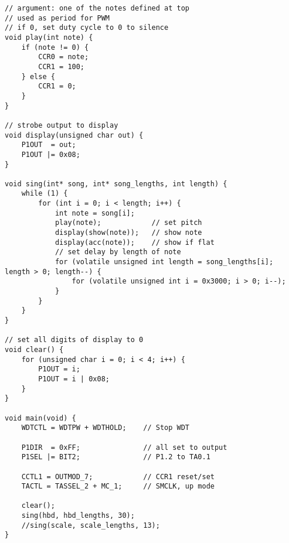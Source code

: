 \documentclass[letterpaper]{article}
\begin{document}
\begin{verbatim}
// argument: one of the notes defined at top
// used as period for PWM
// if 0, set duty cycle to 0 to silence
void play(int note) {
    if (note != 0) {
        CCR0 = note;
        CCR1 = 100;
    } else {
        CCR1 = 0;
    }
}

// strobe output to display
void display(unsigned char out) {
    P1OUT  = out;
    P1OUT |= 0x08;
}

void sing(int* song, int* song_lengths, int length) {
    while (1) {
        for (int i = 0; i < length; i++) {
            int note = song[i];
            play(note);            // set pitch
            display(show(note));   // show note
            display(acc(note));    // show if flat
            // set delay by length of note
            for (volatile unsigned int length = song_lengths[i]; length > 0; length--) {
                for (volatile unsigned int i = 0x3000; i > 0; i--);
            }
        }
    }
}

// set all digits of display to 0
void clear() {
    for (unsigned char i = 0; i < 4; i++) {
        P1OUT = i;
        P1OUT = i | 0x08;
    }
}

void main(void) {
    WDTCTL = WDTPW + WDTHOLD;    // Stop WDT
    
    P1DIR  = 0xFF;               // all set to output
    P1SEL |= BIT2;               // P1.2 to TA0.1
    
    CCTL1 = OUTMOD_7;            // CCR1 reset/set
    TACTL = TASSEL_2 + MC_1;     // SMCLK, up mode
    
    clear();
    sing(hbd, hbd_lengths, 30);
    //sing(scale, scale_lengths, 13);
}
		\end{verbatim}
\end{document}
